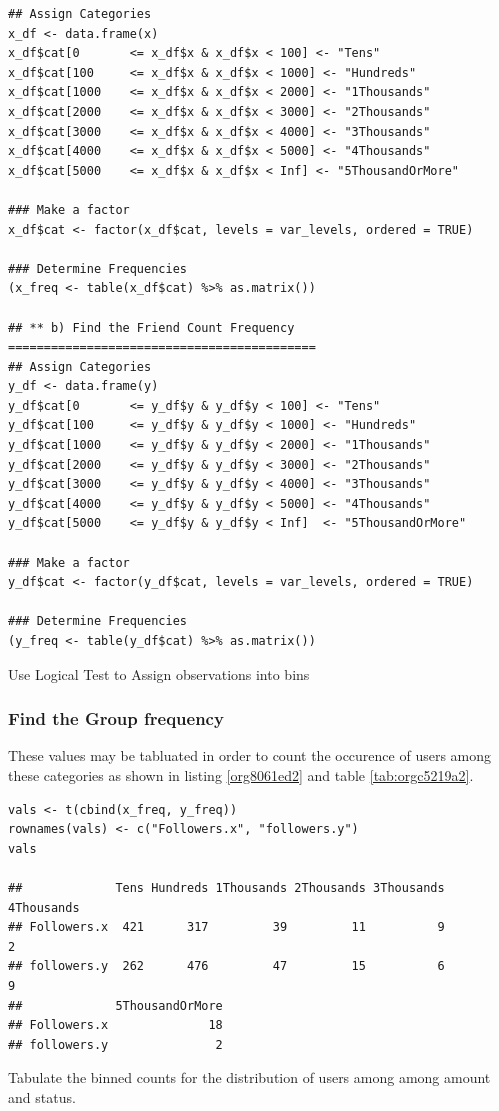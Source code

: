 \documentclass[11pt]{article}
\begin{document}
\begin{listing}[htbp]
\begin{verbatim}
## Assign Categories
x_df <- data.frame(x)
x_df$cat[0       <= x_df$x & x_df$x < 100] <- "Tens"
x_df$cat[100     <= x_df$x & x_df$x < 1000] <- "Hundreds"
x_df$cat[1000    <= x_df$x & x_df$x < 2000] <- "1Thousands"
x_df$cat[2000    <= x_df$x & x_df$x < 3000] <- "2Thousands"
x_df$cat[3000    <= x_df$x & x_df$x < 4000] <- "3Thousands"
x_df$cat[4000    <= x_df$x & x_df$x < 5000] <- "4Thousands"
x_df$cat[5000    <= x_df$x & x_df$x < Inf] <- "5ThousandOrMore"

### Make a factor
x_df$cat <- factor(x_df$cat, levels = var_levels, ordered = TRUE)

### Determine Frequencies
(x_freq <- table(x_df$cat) %>% as.matrix())

## ** b) Find the Friend Count Frequency ===========================================
## Assign Categories
y_df <- data.frame(y)
y_df$cat[0       <= y_df$y & y_df$y < 100] <- "Tens"
y_df$cat[100     <= y_df$y & y_df$y < 1000] <- "Hundreds"
y_df$cat[1000    <= y_df$y & y_df$y < 2000] <- "1Thousands"
y_df$cat[2000    <= y_df$y & y_df$y < 3000] <- "2Thousands"
y_df$cat[3000    <= y_df$y & y_df$y < 4000] <- "3Thousands"
y_df$cat[4000    <= y_df$y & y_df$y < 5000] <- "4Thousands"
y_df$cat[5000    <= y_df$y & y_df$y < Inf]  <- "5ThousandOrMore"

### Make a factor
y_df$cat <- factor(y_df$cat, levels = var_levels, ordered = TRUE)

### Determine Frequencies
(y_freq <- table(y_df$cat) %>% as.matrix())
\end{verbatim}
\caption{\label{orgdd25aaa}Use Logical Test to Assign observations into bins}
\end{listing}

\subsubsection{Find the Group frequency}
\label{sec:org4ec28ef}
These values may be tabluated in order to count the occurence of users among these categories as shown in listing \ref{org8061ed2} and table \ref{tab:orgc5219a2}.

\begin{listing}[htbp]
\begin{verbatim}
vals <- t(cbind(x_freq, y_freq))
rownames(vals) <- c("Followers.x", "followers.y")
vals

##             Tens Hundreds 1Thousands 2Thousands 3Thousands 4Thousands
## Followers.x  421      317         39         11          9          2
## followers.y  262      476         47         15          6          9
##             5ThousandOrMore
## Followers.x              18
## followers.y               2
\end{verbatim}
\caption{\label{org8061ed2}Tabulate the binned counts for the distribution of users among among amount and status.}
\end{listing}
\end{document}

